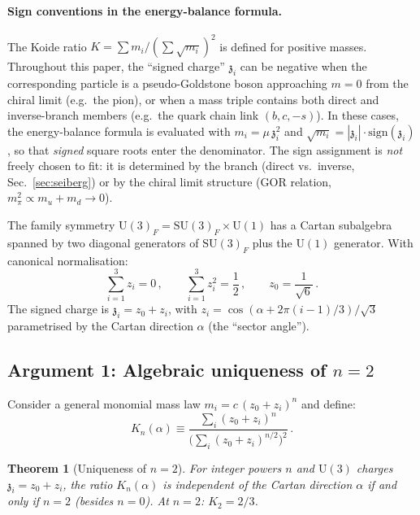 \documentclass[aps,prd,twocolumn,showpacs,preprintnumbers,superscriptaddress,floatfix]{revtex4-2}
\newtheorem{theorem}{Theorem}
\newcommand{\SU}{\mathrm{SU}}
\newcommand{\UU}{\mathrm{U}}
\newcommand{\zch}{\mathfrak{z}}
\begin{document}
\paragraph{Sign conventions in the energy-balance formula.}
The Koide ratio $K = \sum m_i / (\sum\sqrt{m_i})^2$ is defined for
positive masses.
Throughout this paper, the ``signed charge'' $\zch_i$ can be
negative when the corresponding particle is a pseudo-Goldstone
boson approaching $m = 0$ from the chiral limit
(e.g.\ the pion), or when a mass triple contains both direct and
inverse-branch members (e.g.\ the quark chain link $(b, c, -s)$).
In these cases, the energy-balance formula is evaluated with
$m_i = \mu\,\zch_i^2$ and $\sqrt{m_i} = |\zch_i|
\cdot \mathrm{sign}(\zch_i)$, so that \emph{signed} square roots
enter the denominator.
The sign assignment is \emph{not} freely chosen to fit: it is
determined by the branch (direct vs.\ inverse, Sec.~\ref{sec:seiberg})
or by the chiral limit structure (GOR relation, $m_\pi^2 \propto
m_u + m_d \to 0$).

The family symmetry $\UU(3)_F = \SU(3)_F \times \UU(1)$ has a
Cartan subalgebra spanned by two diagonal generators of
$\SU(3)_F$ plus the $\UU(1)$ generator.
With canonical normalisation:
\begin{equation}
  \sum_{i=1}^{3} z_i = 0\,,\qquad
  \sum_{i=1}^{3} z_i^2 = \frac{1}{2}\,,\qquad
  z_0 = \frac{1}{\sqrt{6}}\,.
\end{equation}
The signed charge is $\zch_i = z_0 + z_i$, with
$z_i = \cos(\alpha + 2\pi(i-1)/3)/\sqrt{3}$ parametrised by
the Cartan direction $\alpha$ (the ``sector angle'').


\subsection{Argument 1: Algebraic uniqueness of $n = 2$}
\label{sec:uniqueness_n2}

Consider a general monomial mass law $m_i = c\,(z_0 + z_i)^n$
and define:
\begin{equation}
  K_n(\alpha) \equiv
  \frac{\sum_i (z_0{+}z_i)^n}
  {\bigl(\sum_i (z_0{+}z_i)^{n/2}\bigr)^2}\,.
  \label{eq:Kn}
\end{equation}

\begin{theorem}[Uniqueness of $n = 2$]
\label{thm:n2}
For integer powers $n$ and $\UU(3)$ charges $\zch_i = z_0 + z_i$,
the ratio $K_n(\alpha)$ is independent of the Cartan direction
$\alpha$ if and only if $n = 2$ (besides $n = 0$).
At $n = 2$: $K_2 = 2/3$.
\end{theorem}
\end{document}

